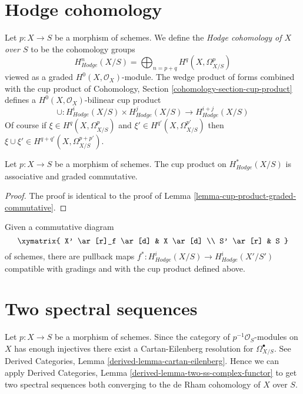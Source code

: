 \section{Hodge cohomology}
\label{section-hodge-cohomology}

\noindent
Let $p : X \to S$ be a morphism of schemes. We define the
{\it Hodge cohomology of $X$ over $S$} to be the cohomology groups
$$
H^n_{Hodge}(X/S) = \bigoplus\nolimits_{n = p + q} H^q(X, \Omega^p_{X/S})
$$
viewed as a graded $H^0(X, \mathcal{O}_X)$-module. The wedge product
of forms combined with the cup product of
Cohomology, Section \ref{cohomology-section-cup-product}
defines a $H^0(X, \mathcal{O}_X)$-bilinear cup product
$$
\cup :
H^i_{Hodge}(X/S) \times H^j_{Hodge}(X/S)
\longrightarrow
H^{i + j}_{Hodge}(X/S)
$$
Of course if  $\xi \in H^q(X, \Omega^p_{X/S})$ and
$\xi' \in H^{q'}(X, \Omega^{p'}_{X/S})$ then $\xi \cup \xi' \in
H^{q + q'}(X, \Omega^{p + p'}_{X/S})$.

\begin{lemma}
\label{lemma-cup-product-hodge-graded-commutative}
Let $p : X \to S$ be a morphism of schemes.
The cup product on $H^*_{Hodge}(X/S)$ is associative and graded commutative.
\end{lemma}

\begin{proof}
The proof is identical to the proof of
Lemma \ref{lemma-cup-product-graded-commutative}.
\end{proof}

\noindent
Given a commutative diagram
$$
\xymatrix{
X' \ar[r]_f \ar[d] & X \ar[d] \\
S' \ar[r] & S
}
$$
of schemes, there are pullback maps
$f^* : H^i_{Hodge}(X/S) \longrightarrow H^i_{Hodge}(X'/S')$
compatible with gradings and with the cup product defined above.







\section{Two spectral sequences}
\label{section-hdoge-to-de-rham}

\noindent
Let $p : X \to S$ be a morphism of schemes. Since the category
of $p^{-1}\mathcal{O}_S$-modules on $X$ has enough injectives
there exist a Cartan-Eilenberg resolution for $\Omega^\bullet_{X/S}$.
See Derived Categories, Lemma \ref{derived-lemma-cartan-eilenberg}.
Hence we can apply Derived Categories, Lemma
\ref{derived-lemma-two-ss-complex-functor} to get two spectral sequences
both converging to the de Rham cohomology of $X$ over $S$.

